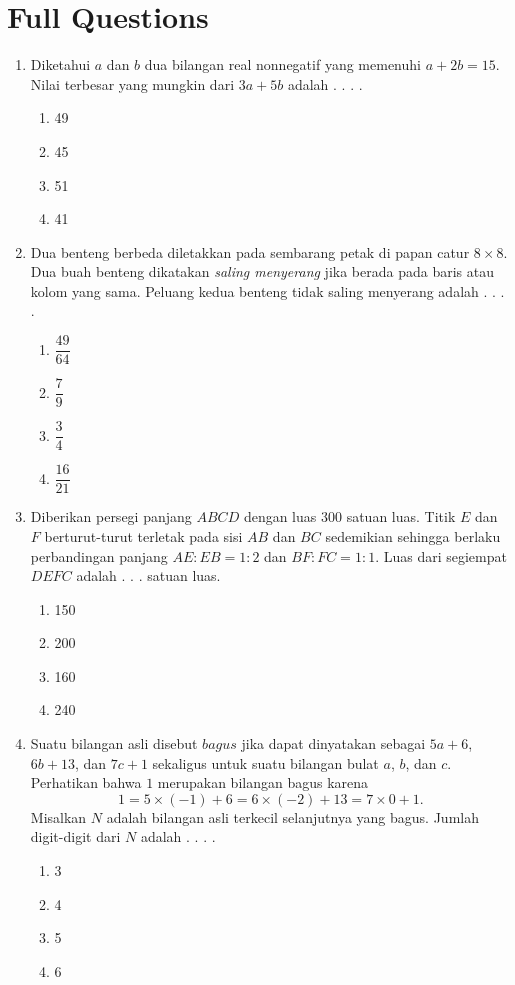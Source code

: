 \documentclass[12pt]{scrartcl}
\begin{document}
\renewcommand*\contentsname{Daftar Isi}
\tableofcontents

\newpage

\section*{Full Questions}
\begin{enumerate}
    \item Diketahui $a$ dan $b$ dua bilangan real nonnegatif yang memenuhi $a+2b=15$. Nilai terbesar yang mungkin dari $3a+5b$ adalah . . . .
    \begin{enumerate}[label={(\Alph*)}]
        \item 49 \item 45 \item 51 \item 41
    \end{enumerate}

    \item Dua benteng berbeda diletakkan pada sembarang petak di papan catur $8\times 8$. Dua buah benteng dikatakan \textit{saling menyerang} jika berada pada baris atau kolom yang sama. Peluang kedua benteng tidak saling menyerang adalah . . . .
    \begin{enumerate}[label={(\Alph*)}]
        \item $\dfrac{49}{64}$ \item $\dfrac{7}{9}$ \item $\dfrac{3}{4}$ \item $\dfrac{16}{21}$
    \end{enumerate}

    \item Diberikan persegi panjang $ABCD$ dengan luas $300$ satuan luas. Titik $E$ dan $F$ berturut-turut terletak pada sisi $AB$ dan $BC$ sedemikian sehingga berlaku perbandingan panjang $AE:EB=1:2$ dan $BF:FC=1:1$. Luas dari segiempat $DEFC$ adalah . . . satuan luas.
    \begin{enumerate}[label={(\Alph*)}]
        \item 150 \item 200 \item 160 \item 240
    \end{enumerate}

    \item Suatu bilangan asli disebut $bagus$ jika dapat dinyatakan sebagai $5a+6$, $6b+13$, dan $7c+1$ sekaligus untuk suatu bilangan bulat $a$, $b$, dan $c$. Perhatikan bahwa $1$ merupakan bilangan bagus karena
    $$1 = 5\times (-1)+6 = 6\times (-2) +13 = 7\times 0+1.$$
    Misalkan $N$ adalah bilangan asli terkecil selanjutnya yang bagus. Jumlah digit-digit dari $N$ adalah . . . .
    \begin{enumerate}[label={(\Alph*)}]
        \item 3 \item 4 \item 5 \item 6
    \end{enumerate}


\end{enumerate}
\end{document}
